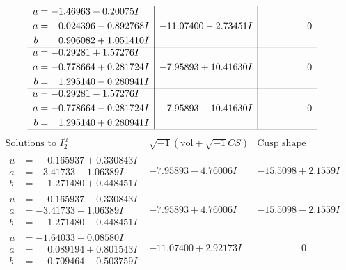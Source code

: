 \documentclass[1p]{elsarticle_modified}
\theoremstyle{definition}
\newcommand{\I}{\sqrt{-1}}
\begin{document}
$$\begin{array}{c|c|c}
\begin{aligned}
u &= -1.46963 - 0.20075 I \\
a &= \phantom{-}0.024396 - 0.892768 I \\
b &= \phantom{-}0.906082 + 1.051410 I\end{aligned}
 & -11.07400 - 2.73451 I & \phantom{-0.000000 } 0 \\ \hline\begin{aligned}
u &= -0.29281 + 1.57276 I \\
a &= -0.778664 + 0.281724 I \\
b &= \phantom{-}1.295140 - 0.280941 I\end{aligned}
 & -7.95893 + 10.41630 I & \phantom{-0.000000 } 0 \\ \hline\begin{aligned}
u &= -0.29281 - 1.57276 I \\
a &= -0.778664 - 0.281724 I \\
b &= \phantom{-}1.295140 + 0.280941 I\end{aligned}
 & -7.95893 - 10.41630 I & \phantom{-0.000000 } 0\\
 \hline 
 \end{array}$$\newpage$$\begin{array}{c|c|c}  
\text{Solutions to }I^u_{2}& \I (\text{vol} + \sqrt{-1}CS) & \text{Cusp shape}\\
 \hline 
\begin{aligned}
u &= \phantom{-}0.165937 + 0.330843 I \\
a &= -3.41733 - 1.06389 I \\
b &= \phantom{-}1.271480 + 0.448451 I\end{aligned}
 & -7.95893 - 4.76006 I & -15.5098 + 2.1559 I \\ \hline\begin{aligned}
u &= \phantom{-}0.165937 - 0.330843 I \\
a &= -3.41733 + 1.06389 I \\
b &= \phantom{-}1.271480 - 0.448451 I\end{aligned}
 & -7.95893 + 4.76006 I & -15.5098 - 2.1559 I \\ \hline\begin{aligned}
u &= -1.64033 + 0.08580 I \\
a &= \phantom{-}0.089194 + 0.801543 I \\
b &= \phantom{-}0.709464 - 0.503759 I\end{aligned}
 & -11.07400 + 2.92173 I & \phantom{-0.000000 } 0 \\ \hline\begin{aligned}

\end{aligned}
\end{array}$$
\end{document}
